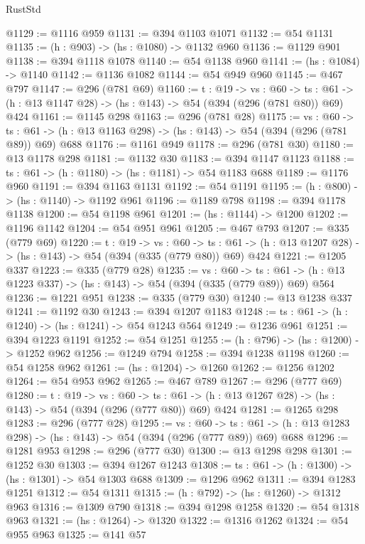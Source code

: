 \begin{lexlean}{RustStd}
\begin{coremodule}
{\begin{coremodule}
{{{{{{{{{{@1129 := @1116 @959
@1131 := @394 @1103 @1071
@1132 := @54 @1131
@1135 := (h : @903) -> (hs : @1080) -> @1132 @960
@1136 := @1129 @901
@1138 := @394 @1118 @1078
@1140 := @54 @1138 @960
@1141 := (hs : @1084) -> @1140
@1142 := @1136 @1082
@1144 := @54 @949 @960
@1145 := @467 @797
@1147 := @296 (@781 @69)
@1160 := {t : @19} ->
  {vs : @60} ->
  {ts : @61} -> (h : @13 @1147 @28) -> (hs : @143) -> @54 (@394 (@296 (@781 @80)) @69) @424
@1161 := @1145 @298
@1163 := @296 (@781 @28)
@1175 := {vs : @60} ->
  {ts : @61} -> (h : @13 @1163 @298) -> (hs : @143) -> @54 (@394 (@296 (@781 @89)) @69) @688
@1176 := @1161 @949
@1178 := @296 (@781 @30)
@1180 := @13 @1178 @298
@1181 := @1132 @30
@1183 := @394 @1147 @1123
@1188 := {ts : @61} -> (h : @1180) -> (hs : @1181) -> @54 @1183 @688
@1189 := @1176 @960
@1191 := @394 @1163 @1131
@1192 := @54 @1191
@1195 := (h : @800) -> (hs : @1140) -> @1192 @961
@1196 := @1189 @798
@1198 := @394 @1178 @1138
@1200 := @54 @1198 @961
@1201 := (hs : @1144) -> @1200
@1202 := @1196 @1142
@1204 := @54 @951 @961
@1205 := @467 @793
@1207 := @335 (@779 @69)
@1220 := {t : @19} ->
  {vs : @60} ->
  {ts : @61} -> (h : @13 @1207 @28) -> (hs : @143) -> @54 (@394 (@335 (@779 @80)) @69) @424
@1221 := @1205 @337
@1223 := @335 (@779 @28)
@1235 := {vs : @60} ->
  {ts : @61} -> (h : @13 @1223 @337) -> (hs : @143) -> @54 (@394 (@335 (@779 @89)) @69) @564
@1236 := @1221 @951
@1238 := @335 (@779 @30)
@1240 := @13 @1238 @337
@1241 := @1192 @30
@1243 := @394 @1207 @1183
@1248 := {ts : @61} -> (h : @1240) -> (hs : @1241) -> @54 @1243 @564
@1249 := @1236 @961
@1251 := @394 @1223 @1191
@1252 := @54 @1251
@1255 := (h : @796) -> (hs : @1200) -> @1252 @962
@1256 := @1249 @794
@1258 := @394 @1238 @1198
@1260 := @54 @1258 @962
@1261 := (hs : @1204) -> @1260
@1262 := @1256 @1202
@1264 := @54 @953 @962
@1265 := @467 @789
@1267 := @296 (@777 @69)
@1280 := {t : @19} ->
  {vs : @60} ->
  {ts : @61} -> (h : @13 @1267 @28) -> (hs : @143) -> @54 (@394 (@296 (@777 @80)) @69) @424
@1281 := @1265 @298
@1283 := @296 (@777 @28)
@1295 := {vs : @60} ->
  {ts : @61} -> (h : @13 @1283 @298) -> (hs : @143) -> @54 (@394 (@296 (@777 @89)) @69) @688
@1296 := @1281 @953
@1298 := @296 (@777 @30)
@1300 := @13 @1298 @298
@1301 := @1252 @30
@1303 := @394 @1267 @1243
@1308 := {ts : @61} -> (h : @1300) -> (hs : @1301) -> @54 @1303 @688
@1309 := @1296 @962
@1311 := @394 @1283 @1251
@1312 := @54 @1311
@1315 := (h : @792) -> (hs : @1260) -> @1312 @963
@1316 := @1309 @790
@1318 := @394 @1298 @1258
@1320 := @54 @1318 @963
@1321 := (hs : @1264) -> @1320
@1322 := @1316 @1262
@1324 := @54 @955 @963
@1325 := @141 @57
}}}}}}}}}}
\end{coremodule}}
\end{coremodule}
\end{lexlean}
